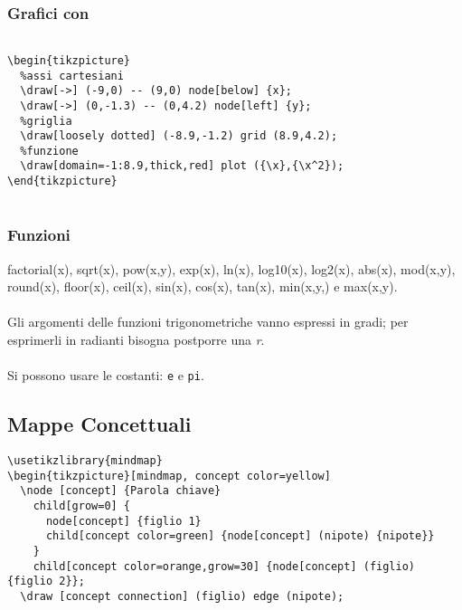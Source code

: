 \subsubsection{Grafici con \Tikz}
  \begin{flushleft}
    \texttt{~\\
    \textbackslash{}begin\{tikzpicture\}\\
    ~~\%assi cartesiani\\
    ~~\textbackslash{}draw[-\textgreater{}] (-9,0) -\hspace{0.01mm}- (9,0) node[below] \{\textdollar{}x\textdollar{}\};
\\
    ~~\textbackslash{}draw[-\textgreater{}] (0,-1.3) -\hspace{0.01mm}- (0,4.2) node[left] \{\textdollar{}y\textdollar{}\};\\
    ~~\%griglia\\
    ~~\textbackslash{}draw[loosely dotted] (-8.9,-1.2) grid (8.9,4.2);\\
    ~~\%funzione
\\
    ~~\textbackslash{}draw[domain=-1:8.9,thick,red] plot (\{\textbackslash{}x\},\{\textbackslash{}x\^{}2\});
\\
    \textbackslash{}end\{tikzpicture\}\\~
    }
    \end{flushleft}
\subsubsection{Funzioni}
 factorial(x), sqrt(x), pow(x,y), exp(x), ln(x), log10(x), log2(x), abs(x), mod(x,y), round(x), floor(x), ceil(x), sin(x), cos(x), tan(x), min(x,y,) e max(x,y).\\~\\
 Gli argomenti delle funzioni trigonometriche vanno espressi in gradi; per esprimerli in radianti bisogna postporre una \emph{r}.\\~\\
 Si possono usare le costanti: \texttt{e} e \texttt{pi}.

\subsection{Mappe Concettuali}
  \texttt{\textbackslash{}usetikzlibrary\{mindmap\}}\\
        \texttt{\textbackslash{}begin\{tikzpicture\}[mindmap, concept color=yellow]\\
~~\textbackslash{}node [concept] \{Parola chiave\}\\
~~~~child[grow=0] \{\\
~~~~~~node[concept] \{figlio 1\}\\
~~~~~~child[concept color=green] \{node[concept] (nipote) \{nipote\}\}\\
~~~~\}\\
~~~~child[concept color=orange,grow=30] \{node[concept] (figlio) \{figlio 2\}\};\\
~~\textbackslash{}draw [concept connection]  (figlio) edge (nipote);
}\\

